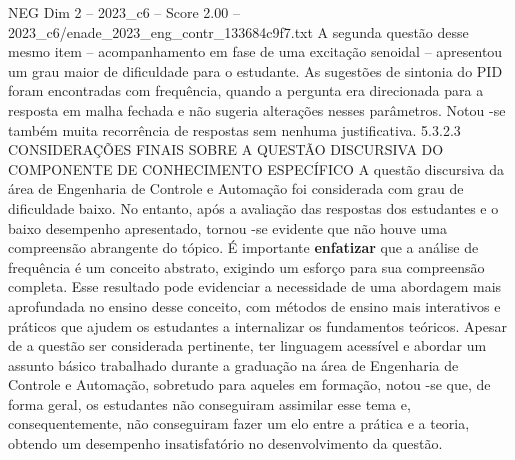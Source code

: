 \begin{textsample}{NEG Dim 2 – 2023\_c6 – Score 2.00 – 2023\_c6/enade\_2023\_eng\_contr\_133684c9f7.txt}
A segunda questão desse mesmo item – acompanhamento em fase de uma excitação senoidal – apresentou um grau maior de dificuldade para o estudante.
As sugestões de sintonia do PID foram encontradas com frequência, quando a pergunta era direcionada para a resposta em malha fechada e não sugeria alterações nesses parâmetros.
Notou -se também muita recorrência de respostas sem nenhuma justificativa. 5.3.2.3 CONSIDERAÇÕES FINAIS SOBRE A QUESTÃO DISCURSIVA DO COMPONENTE DE CONHECIMENTO ESPECÍFICO A questão discursiva da área de Engenharia de Controle e Automação foi considerada com grau de dificuldade baixo.
No entanto, após a avaliação das respostas dos estudantes e o baixo desempenho apresentado, tornou -se evidente que não houve uma compreensão abrangente do tópico.
É importante \textbf{enfatizar} que a análise de frequência é um conceito abstrato, exigindo um esforço para sua compreensão completa.
Esse resultado pode evidenciar a necessidade de uma abordagem mais aprofundada no ensino desse conceito, com métodos de ensino mais interativos e práticos que ajudem os estudantes a internalizar os fundamentos teóricos.
Apesar de a questão ser considerada pertinente, ter linguagem acessível e abordar um assunto básico trabalhado durante a graduação na área de Engenharia de Controle e Automação, sobretudo para aqueles em formação, notou -se que, de forma geral, os estudantes não conseguiram assimilar esse tema e, consequentemente, não conseguiram fazer um elo entre a prática e a teoria, obtendo um desempenho insatisfatório no desenvolvimento da questão.

\end{textsample}
